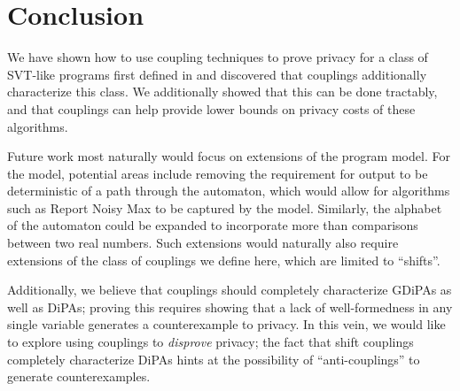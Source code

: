 \section{Conclusion}
We have shown how to use coupling techniques to prove privacy for a class of SVT-like programs first defined in \cite{chadhaLinearTimeDecidability2021} and discovered that couplings additionally characterize this class. We additionally showed that this can be done tractably, and that couplings can help provide lower bounds on privacy costs of these algorithms. 

Future work most naturally would focus on extensions of the program model. For the model, potential areas include removing the requirement for output to be deterministic of a path through the automaton, which would allow for algorithms such as Report Noisy Max to be captured by the model. Similarly, the alphabet of the automaton could be expanded to incorporate more than comparisons between two real numbers. 
Such extensions would naturally also require extensions of the class of couplings we define here, which are limited to ``shifts''. 

Additionally, we believe that couplings should completely characterize GDiPAs as well as DiPAs; proving this requires showing that a lack of well-formedness in any single variable generates a counterexample to privacy. 
In this vein, we would like to explore using couplings to \textit{disprove} privacy; the fact that shift couplings completely characterize DiPAs hints at the possibility of ``anti-couplings'' to generate counterexamples.